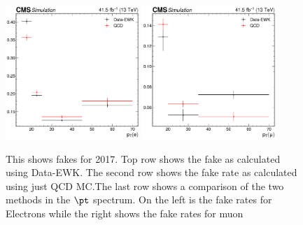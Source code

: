 \begin{figure}
  \includegraphics[width=0.45\textwidth]{measurement/2017/fr_Electron_pt.png} \hfill
  \includegraphics[width=0.45\textwidth]{measurement/2017/fr_Muon_pt.png} \\
  \caption{This shows fakes for 2017. Top row shows the fake as calculated using Data-EWK. The second row shows the fake rate as calculated using just QCD MC.\@ The last row shows a comparison of the two methods in the $\pt$ spectrum. On the left is the fake rates for Electrons while the right shows the fake rates for muon}
\end{figure}

